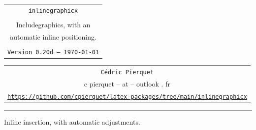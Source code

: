 \documentclass[11pt,a4paper]{ltxdoc}
\def\TPversion{0.20d}
\def\TPdate{\today}
\begin{document}
\thispagestyle{empty}

\begin{center}
  \begin{minipage}{0.88\linewidth}
    \begin{tcolorbox}[colframe=yellow,colback=yellow!15]
      \begin{center}
        \renewcommand{\arraystretch}{1.25}%
        \begin{tabular}{c}
          {\Huge \texttt{inlinegraphicx}}\\
          \\
          {\LARGE Includegraphics, with an} \\
          {\LARGE automatic inline positioning.} \\
          \\
          {\small \texttt{Version \TPversion{} -- \TPdate}}
        \end{tabular}
      \end{center}
    \end{tcolorbox}
  \end{minipage}
\end{center}

\begin{center}
  \begin{tabular}{c}
    \texttt{Cédric Pierquet}\\
    {\ttfamily c pierquet -- at -- outlook . fr}\\
    \texttt{\url{https://github.com/cpierquet/latex-packages/tree/main/inlinegraphicx}} \\
  \end{tabular}
\end{center}

\hrule

\vfill

\begin{tcolorbox}[colframe=lightgray,colback=lightgray!5]
{Inline insertion,  with automatic adjustments.}
\end{tcolorbox}

\begin{tcolorbox}[colframe=lightgray,colback=lightgray!5]
\end{tcolorbox}

\begin{tcolorbox}[colframe=lightgray,colback=lightgray!5]
\end{tcolorbox}
\end{document}
